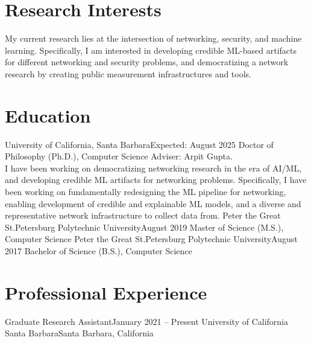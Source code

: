 \documentclass{scv}
\begin{document}

\section{Research Interests}
    \justifying
    My current research lies at the intersection of networking, security, and machine learning. 
    Specifically, I am interested in developing credible ML-based artifacts for different networking and security problems,
    and democratizing a network research by creating public measurement infrastructures and tools.
\vspace{-10pt}

\section{Education}
  \resumeSubHeadingListStart
    \resumeSubheadingWithText
      {University of California, Santa Barbara}{Expected: August 2025}
      {Doctor of Philosophy (Ph.D.), Computer Science}{}
      {Adviser: Arpit Gupta.\\
        I have been working on democratizing networking research in the era of AI/ML, 
        and developing credible ML artifacts for networking problems. 
        Specifically, I have been working on fundamentally redesigning the ML pipeline for networking, 
        enabling development of credible and explainable ML models, and a diverse and representative network 
        infrastructure to collect data from.}{}
    \resumeSubheading
      {Peter the Great St.Petersburg Polytechnic University}{August 2019}
      {Master of Science (M.S.), Computer Science}{}
    \resumeSubheading
      {Peter the Great St.Petersburg Polytechnic University}{August 2017}
      {Bachelor of Science (B.S.), Computer Science}{}
  \resumeSubHeadingListEnd
    
\vspace{-10pt}
\section{Professional Experience}
  \resumeSubHeadingListStart

    \resumeSubheading 
      {Graduate Research Assistant}{January 2021 -- Present}
      {University of California Santa Barbara}{Santa Barbara, California}
      \resumeItemListStart
      \resumeItemListEnd
\end{document}
